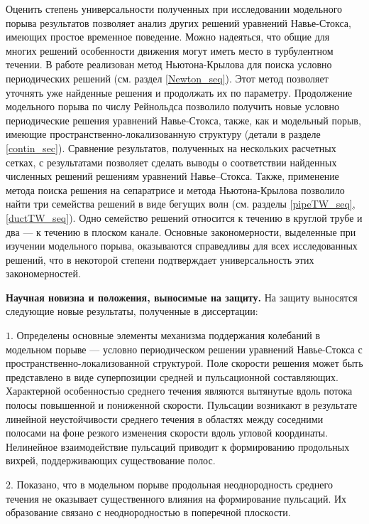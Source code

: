 Оценить степень универсальности полученных при исследовании модельного порыва результатов позволяет анализ других решений уравнений Навье-Стокса, имеющих простое временное поведение. Можно надеяться, что общие для многих решений особенности движения могут иметь место в турбулентном течении. В работе реализован метод Ньютона-Крылова \cite{Viswanath2007, Dijkstra2014} для поиска условно периодических решений (см. раздел  \ref{Newton_seq}). Этот метод позволяет уточнять уже найденные решения и продолжать их по параметру. Продолжение модельного порыва по числу Рейнольдса позволило получить новые условно периодические решения уравнений Навье-Стокса, также, как и модельный порыв, имеющие пространственно-локализованную структуру (детали в разделе \ref{contin_sec}). Сравнение результатов, полученных на нескольких расчетных сетках, с результатами \cite{Avila2013} позволяет сделать выводы о соответствии найденных численных решений решениям уравнений Навье--Стокса. Также, применение метода поиска решения на сепаратрисе и метода Ньютона-Крылова позволило найти три семейства решений в виде бегущих волн (см. разделы \ref{pipeTW_seq}, \ref{ductTW_seq}). Одно семейство решений относится к течению в круглой трубе и два --- к течению в плоском канале. Основные закономерности, выделенные при изучении модельного порыва, оказываются справедливы для всех исследованных решений, что в некоторой степени подтверждает универсальность этих закономерностей. 

{\bf Научная новизна и положения, выносимые на защиту.} На защиту выносятся следующие новые результаты, полученные в диссертации:

 $1.$  Определены основные элементы механизма поддержания колебаний в модельном порыве --- условно периодическом решении уравнений Навье-Стокса с пространственно-локализованной структурой. Поле скорости решения может быть представлено в виде суперпозиции средней и пульсационной составляющих. Характерной особенностью среднего течения являются вытянутые вдоль потока полосы повышенной и пониженной скорости. Пульсации возникают в результате линейной неустойчивости среднего течения в областях между соседними полосами на фоне резкого изменения скорости вдоль угловой координаты. Нелинейное взаимодействие пульсаций приводит к формированию продольных вихрей, поддерживающих существование полос.

 $2.$  Показано, что в модельном порыве продольная неоднородность среднего течения не оказывает существенного влияния на формирование пульсаций. Их образование связано с неоднородностью в поперечной плоскости.

